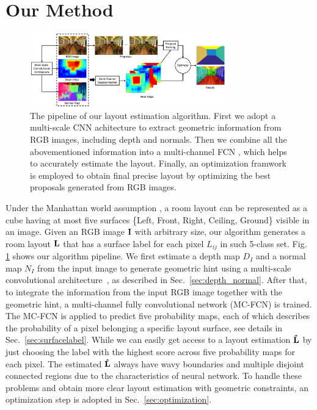 \section{Our Method}
\label{sec:Meth}



\begin{figure}[!ht]
	\centering
	\includegraphics[width=8.5cm]{figure/ppline.png}
	\caption{The pipeline of our layout estimation algorithm. First we adopt a multi-scale CNN achitecture \cite{eigen2015predicting} to extract geometric information from RGB images, including depth and normals. Then we combine all the abovementioned information into a multi-channel FCN , which helps to accurately estimate the layout. Finally, an optimization framwork is employed to obtain final precise layout by optimizing the best proposals generated from RGB images.}
	\label{fig:pipeline}
\end{figure}

Under the Manhattan world assumption \cite{coughlan1999manhattan}, a room layout can be represented as a cube having at most five surfaces \{Left, Front, Right, Ceiling, Ground\} visible in an image. 
%
Given an RGB image $\mathbf{I}$ with arbitrary size, our algorithm generates a room layout $\mathbf{L}$ that has a surface label for each pixel $L_{ij} $ in such 5-class set. Fig. \ref{fig:pipeline} shows our algorithm pipeline. 
We first estimate a depth map $D_{I}$ and a normal map $N_{I}$ from the input image to generate geometric hint using a multi-scale convolutional architecture~\cite{eigen2015predicting}, as described in Sec.~\ref{sec:depth_normal}.
After that, to integrate the information from the input RGB image together with the geometric hint, a multi-channel fully convolutional network (MC-FCN) is trained. The MC-FCN is applied to predict five probability maps, each of which describes the probability of a pixel belonging a specific layout surface, see details in Sec.~\ref{sec:surfacelabel}.
While we can easily get access to a layout estimation $\mathbf{\hat{L}}$ by just choosing the label with the highest score across five probability maps for each pixel. 
The estimated $\mathbf{\hat{L}}$ always have wavy boundaries and multiple disjoint connected regions due to the characteristics of neural network. To handle these problems and obtain more clear layout estimation with geometric constraints, an optimization step is adopted in Sec.~\ref{sec:optimization}.  
 

